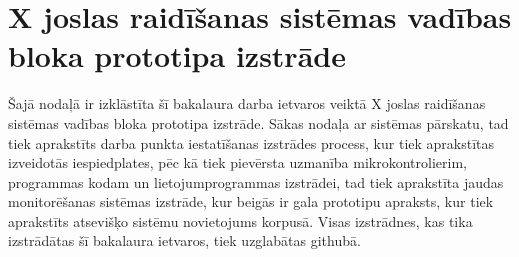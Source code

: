 \chapter{X joslas raidīšanas sistēmas vadības bloka prototipa izstrāde}

Šajā nodaļā ir izklāstīta šī bakalaura darba ietvaros veiktā X joslas raidīšanas sistēmas vadības bloka prototipa izstrāde. Sākas nodaļa ar sistēmas pārskatu, tad tiek aprakstīts darba punkta iestatīšanas izstrādes process, kur tiek aprakstītas izveidotās iespiedplates, pēc kā tiek pievērsta uzmanība mikrokontrolierim, programmas kodam un lietojumprogrammas izstrādei, tad tiek aprakstīta jaudas monitorēšanas sistēmas izstrāde, kur beigās ir gala prototipu apraksts, kur tiek aprakstīts atsevišķo sistēmu novietojums korpusā. Visas izstrādnes, kas tika izstrādātas šī bakalaura ietvaros, tiek uzglabātas githubā\cite{bak_github}.





